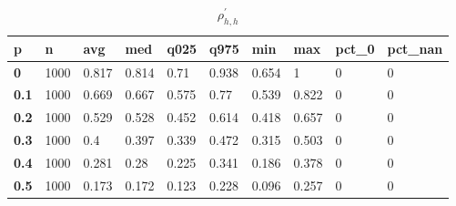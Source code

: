 \begin{table}[h]
 \centering 
\footnotesize
\caption{$\rho_{h,h}^\prime $}
\label{tab:alphahh}
\begin{tabular}[h]{|l|l|l|l|l|l|l|l|l|l|
    } \hline
\textbf{ p} & \textbf{ n} & \textbf{ avg} & \textbf{ med} & \textbf{ q025} & \textbf{ q975} & \textbf{ min} & \textbf{ max} & \textbf{ pct\_0} & \textbf{ pct\_nan}
    \\ \hline
  \textbf{  0} & 1000 & 0.817 & 0.814 &  0.71 & 0.938 & 0.654 &     1 & 0 & 0
    \\ \hline
  \textbf{0.1} & 1000 & 0.669 & 0.667 & 0.575 &  0.77 & 0.539 & 0.822 & 0 & 0
    \\ \hline
  \textbf{0.2} & 1000 & 0.529 & 0.528 & 0.452 & 0.614 & 0.418 & 0.657 & 0 & 0
    \\ \hline
  \textbf{0.3} & 1000 &   0.4 & 0.397 & 0.339 & 0.472 & 0.315 & 0.503 & 0 & 0
    \\ \hline
  \textbf{0.4} & 1000 & 0.281 &  0.28 & 0.225 & 0.341 & 0.186 & 0.378 & 0 & 0
    \\ \hline
  \textbf{0.5} & 1000 & 0.173 & 0.172 & 0.123 & 0.228 & 0.096 & 0.257 & 0 & 0
    \\ \hline
 \end{tabular}
 \end{table}
